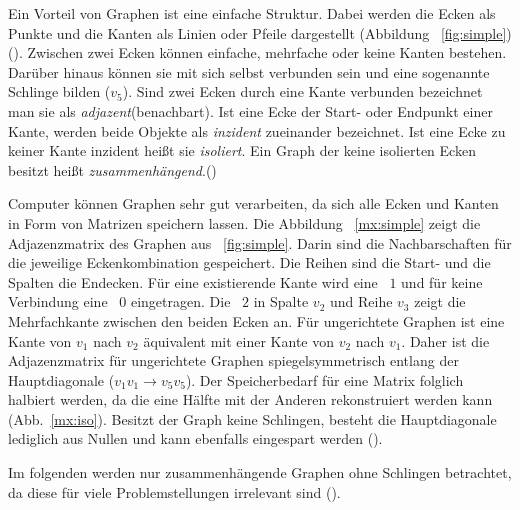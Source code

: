 \documentclass[12pt,a4paper]{article}
\begin{document}
Ein Vorteil von Graphen ist eine einfache Struktur. Dabei werden die Ecken als Punkte und die Kanten als Linien oder Pfeile dargestellt (Abbildung ~\ref{fig:simple}) (\cite[49]{kurt}). Zwischen zwei Ecken können einfache, mehrfache oder keine Kanten bestehen. Darüber hinaus können sie mit sich selbst verbunden sein und eine sogenannte Schlinge bilden ($v_{5}$). Sind zwei Ecken durch eine Kante verbunden bezeichnet man sie als \textit{adjazent}(benachbart). Ist eine Ecke der Start- oder Endpunkt einer Kante, werden beide Objekte als \textit{inzident} zueinander bezeichnet. Ist eine Ecke zu keiner Kante inzident heißt sie \textit{isoliert}. Ein Graph der keine isolierten Ecken besitzt heißt \textit{zusammenhängend}.(\cite[4\psq]{theory}) \par

Computer können Graphen sehr gut verarbeiten, da sich alle Ecken und Kanten in Form von Matrizen speichern lassen. Die Abbildung ~\ref{mx:simple} zeigt die Adjazenzmatrix des Graphen aus ~\ref{fig:simple}. Darin sind die Nachbarschaften für die jeweilige Eckenkombination gespeichert. Die Reihen sind die Start- und die Spalten die Endecken. Für eine existierende Kante wird eine ~$1$ und für keine Verbindung eine ~$0$ eingetragen. Die ~$2$ in Spalte $v_{2}$ und Reihe $v_{3}$ zeigt die Mehrfachkante zwischen den beiden Ecken an. Für ungerichtete Graphen ist eine Kante von $v_{1}$ nach $v_{2}$ äquivalent mit einer Kante von $v_{2}$ nach $v_{1}$. Daher ist die Adjazenzmatrix für ungerichtete Graphen spiegelsymmetrisch entlang der Hauptdiagonale ($v_{1}v_{1} \rightarrow v_{5}v_{5}$). Der Speicherbedarf für eine Matrix folglich halbiert werden, da die eine Hälfte mit der Anderen rekonstruiert werden kann (Abb.~\ref{mx:iso}). Besitzt der Graph keine Schlingen, besteht die Hauptdiagonale lediglich aus Nullen und kann ebenfalls eingespart werden (\cite[19]{algorithms}).

Im folgenden werden nur zusammenhängende Graphen ohne Schlingen betrachtet, da diese für viele Problemstellungen irrelevant sind (\cite[4\psq]{theory}).
\end{document}
